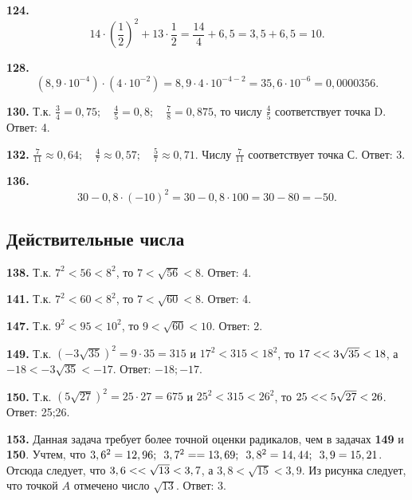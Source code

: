 \textbf{124.} $$14\cdot\left(\frac{1}{2}\right)^2+13\cdot\frac{1}{2}=\frac{14}{4}+6,5=3,5+6,5=10.$$

\textbf{128.}  $$\left(8,9\cdot10^{-4}\right)\cdot\left(4\cdot10^{-2}\right)=8,9\cdot4\cdot10^{-4-2}=35,6\cdot10^{-6}=0,0000356.$$

\textbf{130.} Т.к. $\frac{3}{4}=0,75;\quad\frac{4}{5}=0,8;\quad\frac{7}{8}=0,875$, то числу $\frac{4}{5}$ соответствует  точка D. \newline \null \hspace*{\fill} Ответ: 4. 

\textbf{132.}  $\frac{7}{11}\approx0,64;\quad\frac{4}{7}\approx0,57;\quad\frac{5}{7}\approx0,71$. Числу $\frac{7}{11}$ соответствует точка  С. \newline \null \hspace*{\fill} Ответ: 3. 

\textbf{136.} $$30-0,8\cdot\left(-10\right)^2=30-0,8\cdot100=30-80=-50.$$

\subsection{ Действительные числа}


\textbf{138.} Т.к. $7^2<56<8^2$, то $7<\sqrt{56}<8$.  Ответ: 4. 

\textbf{141.} Т.к. $7^2<60<8^2$, то $7<\sqrt{60}<8$. \newline \null \hspace*{\fill} Ответ: 4. 

\textbf{147.} Т.к. $9^2<95<10^2$, то $9<\sqrt{60}<10$. \newline \null \hspace*{\fill} Ответ: 2. 

\textbf{149.} Т.к. $\left(-3\sqrt{35}\right)^2=9\cdot35=315$ и $17^2<315<18^2$, то $17<\linebreak<3\sqrt{35}<18$, а $-18<-3\sqrt{35}<-17$. \newline \null \hspace*{\fill} Ответ: $-18;-17.$
 
\textbf{150.} Т.к. $\left(5\sqrt{27}\right)^2=25\cdot27=675$ и $25^2<315<26^2$, то $25<\linebreak<5\sqrt{27}<26$. \newline \null \hspace*{\fill} Ответ: 25;26.

\textbf{153.}  Данная задача требует более точной оценки радикалов, чем в задачах \textbf{149} и \textbf{150}.  Учтем, что $3,6^2=12,96;\enspace 3,7^2=\linebreak=13,69;\enspace 3,8^2=14,44;\enspace 3,9=15,21$. Отсюда следует, что $3,6<\linebreak<\sqrt{13}<3,7$, а $3,8<\sqrt{15}<3,9$. Из рисунка  следует, что точкой $A$ отмечено число $\sqrt{13}$. \newline \null \hspace*{\fill} Ответ: 3. 

